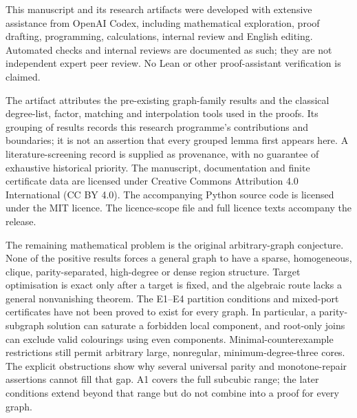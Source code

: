 This manuscript and its research artifacts were developed with extensive
assistance from OpenAI Codex, including mathematical exploration, proof
drafting, programming, calculations, internal review and English editing.
Automated checks and internal reviews are documented as such; they
are not independent expert peer review. No Lean or other proof-assistant
verification is claimed.

The artifact attributes the pre-existing graph-family results and the
classical degree-list, factor, matching and interpolation tools used in
the proofs. Its grouping of results records this research programme's
contributions and boundaries; it is not an assertion that every grouped
lemma first appears here. A literature-screening record is supplied as
provenance, with no guarantee of exhaustive historical priority.
The manuscript, documentation and finite certificate data are licensed
under Creative Commons Attribution 4.0 International (CC BY 4.0).
The accompanying Python source code is licensed under the MIT licence.
The licence-scope file and full licence texts accompany the release.

The remaining mathematical problem is the original arbitrary-graph
conjecture. None of the positive results forces a general graph to have
a sparse, homogeneous, clique, parity-separated, high-degree or dense
region structure. Target optimisation is exact only after a target is
fixed, and the algebraic route lacks a general nonvanishing theorem.
The E1--E4 partition conditions and mixed-port certificates have not been
proved to exist for every graph. In particular, a parity-subgraph
solution can saturate a forbidden local component, and root-only joins
can exclude valid colourings using even components.
Minimal-counterexample restrictions still permit arbitrary large,
nonregular, minimum-degree-three cores. The explicit obstructions show
why several universal parity and monotone-repair assertions cannot
fill that gap. A1 covers the full subcubic range; the later conditions
extend beyond that range but do not combine into a proof for every graph.
